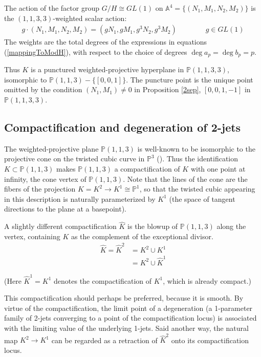 \documentclass[12pt]{article}
\numberwithin{equation}{section}
\theoremstyle{plain}
\theoremstyle{definition}
\renewcommand{\P}{\mathbb{P}}
\newcommand{\GL}{GL}
\newcommand{\ra}{\rightarrow}
\newcommand{\A}{\mathbb{A}}
\begin{document}
The action of the factor group $G/H\cong \GL(1)$ on $\A^{4}=\{(N_1,M_1,N_2,M_2)\}$ is the $(1,1,3,3)$-weighted scalar action:
\begin{align*}
g\cdot (N_1,M_1,N_2,M_2) = (gN_1,gM_1,g^3N_2,g^3M_2)\qquad\qquad g\in \GL(1)
\end{align*}
The weights are the total degrees of the expressions in equations (\ref{mappingToModH}), with respect to the choice of degrees $\operatorname{deg}a_p = \operatorname{deg}b_p = p$. 

Thus $K$ is a punctured weighted-projective hyperplane in $\P(1,1,3,3)$, isomorphic to $\P(1,1,3)-\{[0,0,1]\}$. The puncture point is the unique point omitted by the condition $(N_1,M_1)\neq 0$ in Proposition \ref{2sep}, $[0,0,1,-1]$ in $\P(1,1,3,3)$.

\subsection{Compactification and degeneration of 2-jets}

The weighted-projective plane $\P(1,1,3)$ is well-known to be isomorphic to the projective cone on the twisted cubic curve in $\P^{3}$ (\cite{dolgachevWeighted}). Thus the identification $K\subset\P(1,1,3)$ makes $\P(1,1,3)$ a compactification of $K$ with one point at infinity, the cone vertex of $\P(1,1,3)$. Note that the lines of the cone are the fibers of the projection $K=K^{2}\ra K^{1}\cong \P^{1}$, so that the twisted cubic appearing in this description is naturally parameterized by $K^{1}$ (the space of tangent directions to the plane at a basepoint). %

A slightly different compactification $\widehat{K}$ is the blowup of $\P(1,1,3)$ along the vertex, containing $K$ as the complement of the exceptional divisor. 
\begin{align*}
\widehat{K}=\widehat{K}^{2}&=K^{2} \cup K^{1}\\
& = K^{2} \cup \widehat{K}^{1}
\end{align*}

(Here $\widehat{K}^{1}=K^{1}$ denotes the compactification of $K^{1}$, which is already compact.)

This compactification should perhaps be preferred, because it is smooth. By virtue of the compactification, the limit point of a degeneration (a 1-parameter family of 2-jets converging to a point of the compactification locus) is associated with the limiting value of the underlying 1-jets. Said another way, the natural map $K^{2}\ra K^{1}$ can be regarded as a retraction of $\widehat{K}^{2}$ onto its compactification locus.
\end{document}
